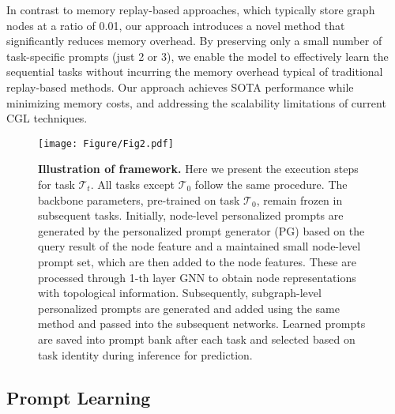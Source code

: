 In contrast to memory replay-based approaches, which typically store graph nodes at a ratio of 0.01, our approach introduces a novel method that significantly reduces memory overhead. By preserving only a small number of task-specific prompts (just 2 or 3), we enable the model to effectively learn the sequential tasks without incurring the memory overhead typical of traditional replay-based methods. Our approach achieves SOTA performance while minimizing memory costs, and addressing the scalability limitations of current CGL techniques.

\begin{figure*}[t]
	\centering
	\texttt{[image: Figure/Fig2.pdf]}
	\caption{\textbf{Illustration of \ourmethod framework.} Here we present the execution steps for task $\mathcal{T}_t$. All tasks except $\mathcal{T}_0$ follow the same procedure. The backbone parameters, pre-trained on task $\mathcal{T}_0$, remain frozen in subsequent tasks. Initially, node-level personalized prompts are generated by the personalized prompt generator (PG) based on the query result of the node feature and a maintained small node-level prompt set, which are then added to the node features. These are processed through 1-th layer GNN to obtain node representations with topological information. Subsequently, subgraph-level personalized prompts are generated and added using the same method and passed into the subsequent networks. Learned prompts are saved into prompt bank after each task and selected based on task identity during inference for prediction.}
	\label{fig2}
\end{figure*}

\subsection{Prompt Learning}

